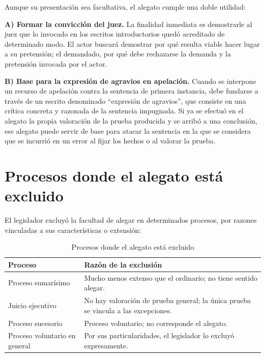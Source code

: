 \documentclass[12pt,oneside]{book}
\begin{document}
Aunque su presentación sea facultativa, el alegato cumple una doble utilidad:

\textbf{A) Formar la convicción del juez.} La finalidad inmediata es demostrarle al juez que lo invocado en los escritos introductorios quedó acreditado de determinado modo. El actor buscará demostrar por qué resulta viable hacer lugar a su pretensión; el demandado, por qué debe rechazarse la demanda y la pretensión invocada por el actor.

\textbf{B) Base para la expresión de agravios en apelación.} Cuando se interpone un recurso de apelación contra la sentencia de primera instancia, debe fundarse a través de un escrito denominado ``expresión de agravios'', que consiste en una crítica concreta y razonada de la sentencia impugnada. Si ya se efectuó en el alegato la propia valoración de la prueba producida y se arribó a una conclusión, ese alegato puede servir de base para atacar la sentencia en la que se considera que se incurrió en un error al fijar los hechos o al valorar la prueba.

\section{Procesos donde el alegato está excluido}

El legislador excluyó la facultad de alegar en determinados procesos, por razones vinculadas a sus características o extensión:

\begin{table}[H]
\centering
\begin{tabularx}{\textwidth}{
    >{\raggedright\arraybackslash}p{}
    >{\raggedright\arraybackslash}X
}
\toprule
\textbf{Proceso} & \textbf{Razón de la exclusión} \\
\midrule
Proceso sumarísimo & Mucho menos extenso que el ordinario; no tiene sentido alegar. \\
\addlinespace
Juicio ejecutivo & No hay valoración de prueba general; la única prueba se vincula a las excepciones. \\
\addlinespace
Proceso sucesorio & Proceso voluntario; no corresponde el alegato. \\
\addlinespace
Proceso voluntario en general & Por sus particularidades, el legislador lo excluyó expresamente. \\
\bottomrule
\end{tabularx}
\caption{Procesos donde el alegato está excluido}
\end{table}
\end{document}
